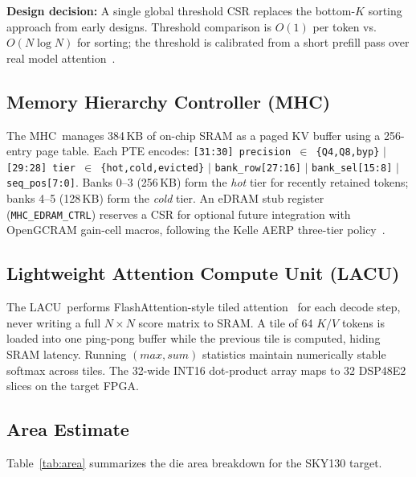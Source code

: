 \documentclass[conference]{IEEEtran}
\newcommand{\mhc}{\textsc{MHC}}
\newcommand{\lacu}{\textsc{LACU}}
\begin{document}
\textbf{Design decision:} A single global threshold CSR replaces the
bottom-$K$ sorting approach from early designs. Threshold comparison
is $O(1)$ per token vs.\ $O(N\log N)$ for sorting; the threshold is
calibrated from a short prefill pass over real model
attention~\cite{snapkv2024}.

\subsection{Memory Hierarchy Controller (\mhc)}

The \mhc\ manages 384\,KB of on-chip SRAM as a paged KV buffer using
a 256-entry page table. Each PTE encodes:
\texttt{[31:30]~precision~$\in$~\{Q4,Q8,byp\}} $|$
\texttt{[29:28]~tier~$\in$~\{hot,cold,evicted\}} $|$
\texttt{bank\_row[27:16]} $|$ \texttt{bank\_sel[15:8]} $|$
\texttt{seq\_pos[7:0]}.
Banks 0--3 (256\,KB) form the \emph{hot} tier for recently retained
tokens; banks 4--5 (128\,KB) form the \emph{cold} tier. An eDRAM
stub register (\texttt{MHC\_EDRAM\_CTRL}) reserves a CSR for optional
future integration with OpenGCRAM gain-cell macros, following the
Kelle AERP three-tier policy~\cite{kelle2025}.

\subsection{Lightweight Attention Compute Unit (\lacu)}

The \lacu\ performs FlashAttention-style tiled attention~\cite{fa3_2024}
for each decode step, never writing a full $N{\times}N$ score matrix
to SRAM. A tile of 64 $K/V$ tokens is loaded into one ping-pong buffer
while the previous tile is computed, hiding SRAM latency. Running
$(\textit{max}, \textit{sum})$ statistics maintain numerically stable
softmax across tiles. The 32-wide INT16 dot-product array maps to 32
DSP48E2 slices on the target FPGA.

\subsection{Area Estimate}

Table~\ref{tab:area} summarizes the die area breakdown for the
SKY130 target.
\end{document}
